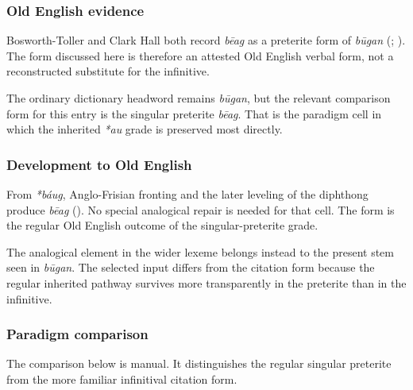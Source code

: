 \documentclass[
  british,
  a4paper,
]{article}
\begin{document}
\subsubsection{Old English evidence}\label{old-english-evidence-1}

Bosworth-Toller and Clark Hall both record \emph{bēag} as a preterite
form of \emph{būgan} (; ).
The form discussed here is therefore an attested Old English verbal
form, not a reconstructed substitute for the infinitive.

The ordinary dictionary headword remains \emph{būgan}, but the relevant
comparison form for this entry is the singular preterite \emph{bēag}.
That is the paradigm cell in which the inherited \emph{*au} grade is
preserved most directly.

\subsubsection{Development to Old
English}\label{development-to-old-english-1}

From \emph{*báug}, Anglo-Frisian fronting and the later leveling of the
diphthong produce \emph{bēag} (). No special analogical repair is needed for that cell. The
form is the regular Old English outcome of the singular-preterite grade.

The analogical element in the wider lexeme belongs instead to the
present stem seen in \emph{būgan}. The selected input differs from the
citation form because the regular inherited pathway survives more
transparently in the preterite than in the infinitive.

\subsubsection{Paradigm comparison}\label{paradigm-comparison}

The comparison below is manual. It distinguishes the regular singular
preterite from the more familiar infinitival citation form.
\end{document}
